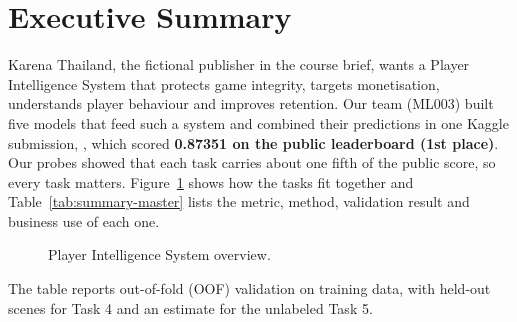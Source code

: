 \section{Executive Summary}
\label{sec:summary}

Karena Thailand, the fictional publisher in the course brief, wants a Player Intelligence System that protects game integrity, targets monetisation, understands player behaviour and improves retention. Our team (ML003) built five models that feed such a system and combined their predictions in one Kaggle submission, , which scored \textbf{0.87351 on the public leaderboard (1st place)}. Our probes showed that each task carries about one fifth of the public score, so every task matters. Figure~\ref{fig:summary-overview} shows how the tasks fit together and Table~\ref{tab:summary-master} lists the metric, method, validation result and business use of each one.

\begin{figure}[H]
\centering
{}
\caption{Player Intelligence System overview.}
\label{fig:summary-overview}
\end{figure}

The table reports out-of-fold (OOF) validation on training data, with held-out scenes for Task 4 and an estimate for the unlabeled Task 5.

